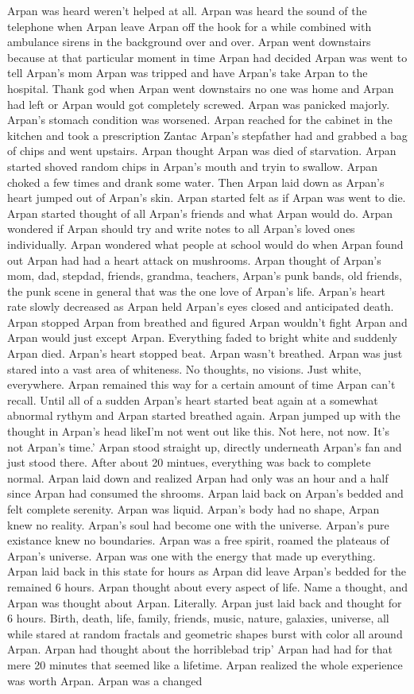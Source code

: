 \documentclass[12pt]{book}
\begin{document}
Arpan was heard weren't helped at all. Arpan was heard the sound of the telephone when Arpan leave Arpan off the hook for a while combined with ambulance sirens in the background over and over. Arpan went downstairs because at that particular moment in time Arpan had decided Arpan was went to tell Arpan's mom Arpan was tripped and have Arpan's take Arpan to the hospital. Thank god when Arpan went downstairs no one was home and Arpan had left or Arpan would got completely screwed. Arpan was panicked majorly. Arpan's stomach condition was worsened. Arpan reached for the cabinet in the kitchen and took a prescription Zantac Arpan's stepfather had and grabbed a bag of chips and went upstairs. Arpan thought Arpan was died of starvation. Arpan started shoved random chips in Arpan's mouth and tryin to swallow. Arpan choked a few times and drank some water. Then Arpan laid down as Arpan's heart jumped out of Arpan's skin. Arpan started felt as if Arpan was went to die. Arpan started thought of all Arpan's friends and what Arpan would do. Arpan wondered if Arpan should try and write notes to all Arpan's loved ones individually. Arpan wondered what people at school would do when Arpan found out Arpan had had a heart attack on mushrooms. Arpan thought of Arpan's mom, dad, stepdad, friends, grandma, teachers, Arpan's punk bands, old friends, the punk scene in general that was the one love of Arpan's life. Arpan's heart rate slowly decreased as Arpan held Arpan's eyes closed and anticipated death. Arpan stopped Arpan from breathed and figured Arpan wouldn't fight Arpan and Arpan would just except Arpan. Everything faded to bright white and suddenly Arpan died. Arpan's heart stopped beat. Arpan wasn't breathed. Arpan was just stared into a vast area of whiteness. No thoughts, no visions. Just white, everywhere. Arpan remained this way for a certain amount of time Arpan can't recall. Until all of a sudden Arpan's heart started beat again at a somewhat abnormal rythym and Arpan started breathed again. Arpan jumped up with the thought in Arpan's head likeI'm not went out like this. Not here, not now. It's not Arpan's time.' Arpan stood straight up, directly underneath Arpan's fan and just stood there. After about 20 mintues, everything was back to complete normal. Arpan laid down and realized Arpan had only was an hour and a half since Arpan had consumed the shrooms. Arpan laid back on Arpan's bedded and felt complete serenity. Arpan was liquid. Arpan's body had no shape, Arpan knew no reality. Arpan's soul had become one with the universe. Arpan's pure existance knew no boundaries. Arpan was a free spirit, roamed the plateaus of Arpan's universe. Arpan was one with the energy that made up everything. Arpan laid back in this state for hours as Arpan did leave Arpan's bedded for the remained 6 hours. Arpan thought about every aspect of life. Name a thought, and Arpan was thought about Arpan. Literally. Arpan just laid back and thought for 6 hours. Birth, death, life, family, friends, music, nature, galaxies, universe, all while stared at random fractals and geometric shapes burst with color all around Arpan. Arpan had thought about the horriblebad trip' Arpan had had for that mere 20 minutes that seemed like a lifetime. Arpan realized the whole experience was worth Arpan. Arpan was a changed 
\end{document}
